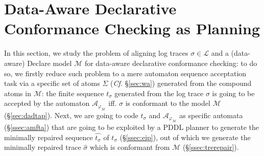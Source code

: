 \section{Data-Aware Declarative Conformance Checking as Planning}\label{sec:dccap}
In this section, we study the problem of aligning log traces $\sigma\in\mathcal{L}$ and a (data-aware) Declare model $\mathcal{M}$ for data-aware declarative conformance checking: to do so, we firstly reduce such problem to a mere automaton sequence acceptation task via a specific set of atoms $\Sigma$ (\textit{Cf.} \S\ref{sec:wa}) generated from the compound atoms in $\mathcal{M}$: the finite sequence $t_\sigma$ generated from the log trace $\sigma$ is going to be accepted by the automaton $\mathcal{A}_{\varphi_{\mathcal{M}}}$ iff. $\sigma$ is conformant to the model $\mathcal{M}$ (\S\ref{sec:dadtap}). Next, we are going to code $t_\sigma$ and $\mathcal{A}_{\varphi_{\mathcal{M}}}$ as specific automata (\S\ref{ssec:amfta}) that are going to be exploited by a PDDL planner to generate the minimally repaired sequence $\hat{t_\sigma}$ of $t_\sigma$ (\S\ref{ssec:eip}), out of which we generate the minimally repaired trace $\hat{\sigma}$ which is conformant from $\mathcal{M}$ (\S\ref{ssec:trerepair}).






